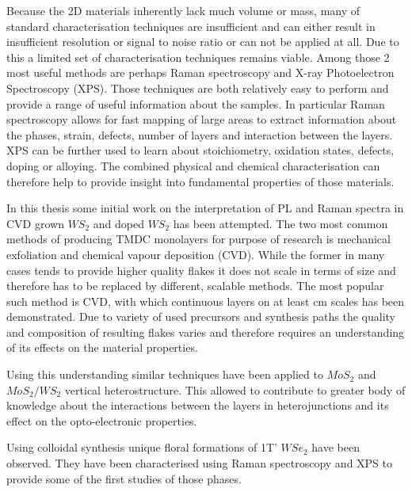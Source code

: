 Because the 2D materials inherently lack much volume or mass, many of standard characterisation techniques are insufficient and can either result in insufficient resolution or signal to noise ratio or can not be applied at all. Due to this a limited set of characterisation techniques remains viable. Among those 2 most useful methods are perhaps Raman spectroscopy and X-ray Photoelectron Spectroscopy (XPS). Those techniques are both relatively easy to perform and provide a range of useful information about the samples. In particular Raman spectroscopy allows for fast mapping of large areas to extract information about the phases, strain, defects, number of layers and interaction between the layers. XPS can be further used to learn about stoichiometry, oxidation states, defects, doping or alloying. The combined physical and chemical characterisation can therefore help to provide insight into fundamental properties of those materials.

In this thesis some initial work on the interpretation of PL and Raman spectra in CVD grown $WS_2$ and doped $WS_2$ has been attempted. The two most common methods of producing TMDC monolayers for purpose of research is mechanical exfoliation and chemical vapour deposition (CVD). While the former in many cases tends to provide higher quality flakes it does not scale in terms of size and therefore has to be replaced by different, scalable methods. The most popular such method is CVD, with which continuous layers on at least cm scales has been demonstrated. Due to variety of used precursors and synthesis paths the quality and composition of resulting flakes varies and therefore requires an understanding of its effects on the material properties. 

Using this understanding similar techniques have been applied to $MoS_2$ and $MoS_2/WS_2$ vertical heterostructure. This allowed to contribute to greater body of knowledge about the interactions between the layers in heterojunctions and its effect on the opto-electronic properties.

Using colloidal synthesis unique floral formations of 1T' $WSe_2$ have been observed. They have been characterised using Raman spectroscopy and XPS to provide some of the first studies of those phases. 